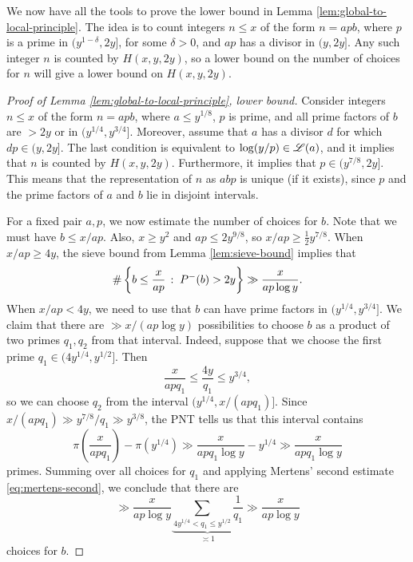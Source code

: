 We now have all the tools to prove the lower bound in Lemma \ref{lem:global-to-local-principle}.
The idea is to count integers $n \le x$ of the form $n = apb$, where $p$ is a prime in $(y^{1 - \delta}, 2y]$, for some $\delta > 0$, and $ap$ has a divisor in $(y, 2y]$. 
Any such integer $n$ is counted by $H(x, y, 2y)$, so a lower bound on the number of choices for $n$ will give a lower bound on $H(x, y, 2y)$.
\begin{proof}[Proof of Lemma \ref{lem:global-to-local-principle}, lower bound]
    Consider integers $n \le x$ of the form $n = apb$, where $a \le y^{1/8}$, $p$ is prime, and all prime factors of $b$ are $> 2y$ or in $(y^{1/4}, y^{3/4}]$.
    Moreover, assume that $a$ has a divisor $d$ for which $dp \in (y, 2y]$.
    The last condition is equivalent to $\log(y/p) \in \mathscr{L}(a)$, and it implies that $n$ is counted by $H(x, y, 2y)$. 
    Furthermore, it implies that $p \in (y^{7/8}, 2y]$.
    This means that the representation of $n$ as $abp$ is unique (if it exists), since $p$ and the prime factors of $a$ and $b$ lie in disjoint intervals.

    For a fixed pair $a, p$, we now estimate the number of choices for $b$.
    Note that we must have $b \le x/ap$.
    Also, $x \ge y^2$ and $ap \le 2y^{9/8}$, so $x/ap \ge \frac{1}{2}y^{7/8}$.
    When $x / ap \ge 4y$, the sieve bound from Lemma \ref{lem:sieve-bound} implies that 
    \begin{equation*}
        \#\left\{b \le \frac{x}{ap}\,:\;P^-(b) > 2y\right\} \gg \frac{x}{ap \log y}.
    \end{equation*}
    When $x/ap < 4y$, we need to use that $b$ can have prime factors in $(y^{1/4}, y^{3/4}]$.
    We claim that there are $\gg x/(ap \log y)$ possibilities to choose $b$ as a product of two primes $q_1, q_2$ from that interval.
    Indeed, suppose that we choose the first prime $q_1 \in (4y^{1/4}, y^{1/2}]$.    
    Then 
    \begin{equation*}
         \frac{x}{apq_1} \le \frac{4y}{q_1} \le y^{3/4},
    \end{equation*}
    so we can choose $q_2$ from the interval $(y^{1/4}, x/(apq_1)]$.
    Since $x/(apq_1) \gg y^{7/8} / q_1 \gg y^{3/8}$,
    the PNT tells us that this interval contains 
    \begin{equation*}
        \pi\left( \frac{x}{apq_1} \right) - \pi\left(y^{1/4}\right)\gg \frac{x}{apq_1 \log y} - y^{1/4} \gg \frac{x}{apq_1 \log y}
    \end{equation*}
    primes. 
    Summing over all choices for $q_1$ and applying Mertens' second estimate \eqref{eq:mertens-second}, we conclude that there are
    \begin{equation*}
        \gg \frac{x}{a p \log y} \underbrace{\sum \limits_{4y^{1/4} < q_1 \le y^{1/2}} \frac{1}{q_1}}_{\asymp 1} \gg \frac{x}{a p \log y}
    \end{equation*}
    choices for $b$.


\end{proof}
